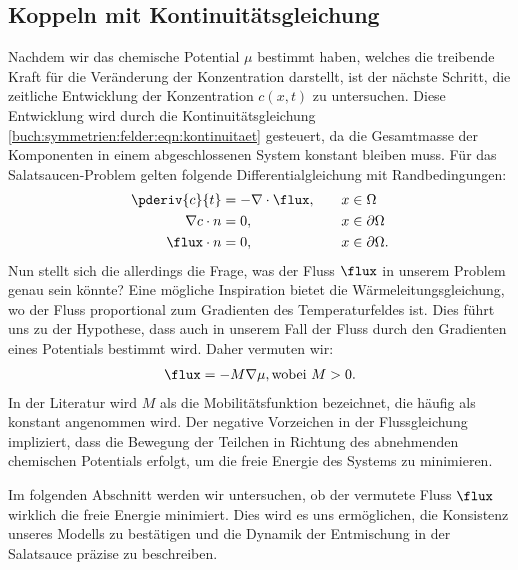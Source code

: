 \subsection{Koppeln mit Kontinuitätsgleichung}
Nachdem wir das chemische Potential $\mu$ bestimmt haben,
welches die treibende Kraft für die Veränderung der Konzentration darstellt,
ist der nächste Schritt,
die zeitliche Entwicklung der Konzentration $c(x,t)$ zu untersuchen.
Diese Entwicklung wird durch die Kontinuitätsgleichung
\eqref{buch:symmetrien:felder:eqn:kontinuitaet} gesteuert,
da die Gesamtmasse der Komponenten in einem abgeschlossenen System konstant bleiben muss.
Für das Salatsaucen-Problem gelten folgende Differentialgleichung mit Randbedingungen:
\begin{align}
\begin{aligned}
\pderiv{c}{t}
&=
- \nabla \cdot \flux
,\quad&
x &\in \Omega
\\
\nabla c \cdot n
&=
0
,&
x &\in \partial\Omega
\\
\flux \cdot n
&=
0
,&
x &\in \partial\Omega
.
\end{aligned}
\label{cahnhilliard:continuity}
\end{align}
Nun stellt sich die allerdings die Frage,
was der Fluss $\flux$ in unserem Problem genau sein könnte?
Eine mögliche Inspiration bietet die Wärmeleitungsgleichung,
wo der Fluss proportional zum Gradienten des Temperaturfeldes ist.
Dies führt uns zu der Hypothese, dass auch in unserem Fall der Fluss
durch den Gradienten eines Potentials bestimmt wird.
Daher vermuten wir:
\begin{align*}
\flux
=
- M \nabla \mu
,\text{wobei } M > 0
.
\end{align*}
In der Literatur wird $M$ als die Mobilitätsfunktion bezeichnet,
die häufig als konstant angenommen wird.
Der negative Vorzeichen in der Flussgleichung impliziert,
dass die Bewegung der Teilchen in Richtung des abnehmenden chemischen Potentials erfolgt,
um die freie Energie des Systems zu minimieren.

Im folgenden Abschnitt werden wir untersuchen,
ob der vermutete Fluss $\flux$ wirklich die freie Energie minimiert.
Dies wird es uns ermöglichen,
die Konsistenz unseres Modells zu bestätigen und
die Dynamik der Entmischung in der Salatsauce präzise zu beschreiben.

